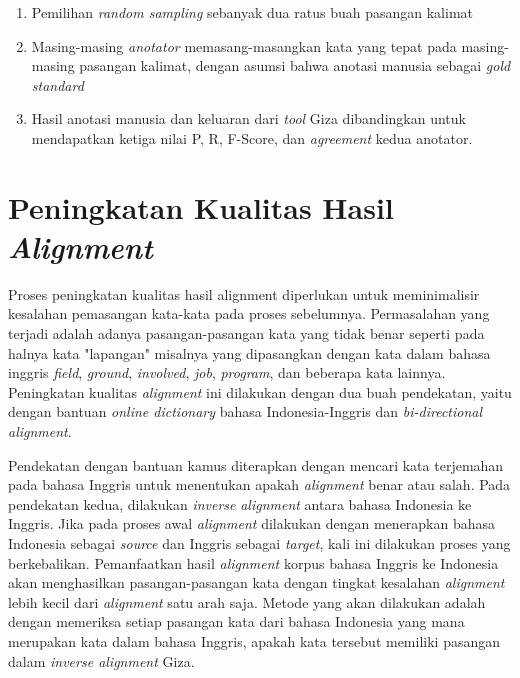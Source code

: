 \begin{enumerate}
	\item Pemilihan \textit{random sampling} sebanyak dua ratus buah pasangan kalimat
	\item Masing-masing \textit{anotator} memasang-masangkan kata yang tepat pada masing-masing pasangan kalimat, dengan asumsi bahwa anotasi manusia sebagai \textit{gold standard}
	\item Hasil anotasi manusia dan keluaran dari \textit{tool} Giza dibandingkan untuk mendapatkan ketiga nilai P, R, F-Score, dan \textit{agreement} kedua anotator.
\end{enumerate}


\section{Peningkatan Kualitas Hasil \textit{Alignment}}
Proses peningkatan kualitas hasil alignment diperlukan untuk meminimalisir kesalahan pemasangan kata-kata pada proses sebelumnya. Permasalahan  yang terjadi adalah adanya pasangan-pasangan kata yang tidak benar seperti pada halnya kata "lapangan" misalnya yang  dipasangkan dengan kata dalam bahasa inggris \textit{field}, \textit{ground}, \textit{involved}, \textit{job}, \textit{program}, dan beberapa kata lainnya. Peningkatan kualitas \textit{alignment} ini dilakukan dengan dua buah pendekatan, yaitu dengan bantuan \textit{online dictionary} bahasa Indonesia-Inggris dan \textit{bi-directional alignment}. 

Pendekatan dengan bantuan kamus diterapkan dengan mencari kata terjemahan pada bahasa Inggris untuk menentukan apakah \textit{alignment} benar atau salah. Pada pendekatan kedua, dilakukan \textit{inverse} \textit{alignment} antara bahasa Indonesia ke Inggris. Jika pada proses awal \textit{alignment} dilakukan dengan menerapkan bahasa Indonesia sebagai \textit{source} dan Inggris sebagai \textit{target}, kali ini dilakukan proses yang berkebalikan. Pemanfaatkan hasil \textit{alignment} korpus bahasa Inggris ke Indonesia akan menghasilkan pasangan-pasangan kata dengan tingkat kesalahan \textit{alignment} lebih kecil dari \textit{alignment} satu arah saja. Metode yang akan dilakukan adalah dengan memeriksa setiap pasangan kata dari bahasa Indonesia yang mana merupakan kata dalam bahasa Inggris, apakah kata tersebut memiliki pasangan dalam \textit{inverse alignment} Giza.

